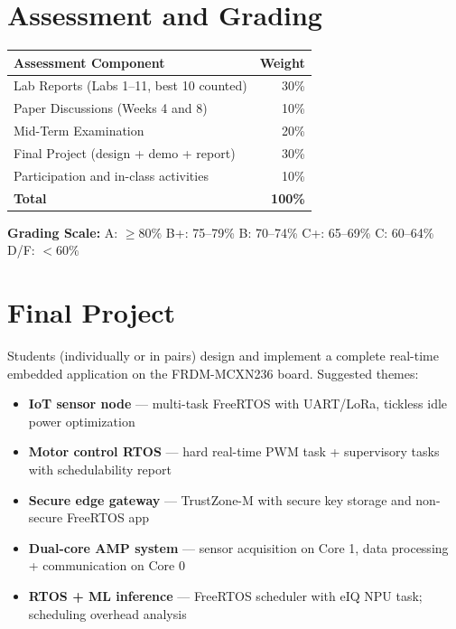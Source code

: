 \documentclass[12pt, a4paper]{article}
\begin{document}
\section{Assessment and Grading}

\begin{tabular}{@{}p{7.5cm} r@{}}
  \toprule
  \textbf{Assessment Component} & \textbf{Weight} \\
  \midrule
  Lab Reports (Labs 1--11, best 10 counted)   & 30\% \\
  Paper Discussions (Weeks 4 and 8)           & 10\% \\
  Mid-Term Examination                        & 20\% \\
  Final Project (design + demo + report)      & 30\% \\
  Participation and in-class activities       & 10\% \\
  \midrule
  \textbf{Total}                              & \textbf{100\%} \\
  \bottomrule
\end{tabular}

\vspace{0.5em}
\noindent\textbf{Grading Scale:}\quad
A: $\geq 80\%$ \quad B+: 75--79\% \quad B: 70--74\% \quad
C+: 65--69\% \quad C: 60--64\% \quad D/F: $<60\%$

\section{Final Project}

Students (individually or in pairs) design and implement a complete real-time embedded
application on the FRDM-MCXN236 board. Suggested themes:

\begin{itemize}[noitemsep]
  \item \textbf{IoT sensor node} --- multi-task FreeRTOS with UART/LoRa, tickless idle power optimization
  \item \textbf{Motor control RTOS} --- hard real-time PWM task + supervisory tasks with schedulability report
  \item \textbf{Secure edge gateway} --- TrustZone-M with secure key storage and non-secure FreeRTOS app
  \item \textbf{Dual-core AMP system} --- sensor acquisition on Core 1, data processing + communication on Core 0
  \item \textbf{RTOS + ML inference} --- FreeRTOS scheduler with eIQ NPU task; scheduling overhead analysis
\end{itemize}
\end{document}
